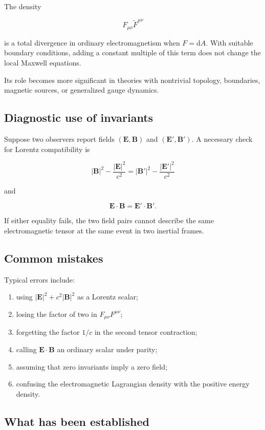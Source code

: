 The density

\[
F_{\mu\nu}
\widetilde{F}^{\mu\nu}
\]

is a total divergence in ordinary electromagnetism when \(F=\mathrm{d}A\). With suitable boundary conditions, adding a constant multiple of this term does not change the local Maxwell equations.

Its role becomes more significant in theories with nontrivial topology, boundaries, magnetic sources, or generalized gauge dynamics.

\subsection{Diagnostic use of invariants}

Suppose two observers report fields \((\mathbf{E},\mathbf{B})\) and \((\mathbf{E}',\mathbf{B}')\). A necessary check for Lorentz compatibility is

\[
|\mathbf{B}|^2
-
\frac{|\mathbf{E}|^2}{c^2}
=
|\mathbf{B}'|^2
-
\frac{|\mathbf{E}'|^2}{c^2}
\]

and

\[
\mathbf{E}\cdot\mathbf{B}
=
\mathbf{E}'\cdot\mathbf{B}'.
\]

If either equality fails, the two field pairs cannot describe the same electromagnetic tensor at the same event in two inertial frames.

\subsection{Common mistakes}

Typical errors include:

\begin{enumerate}
    \item using \(|\mathbf{E}|^2+c^2|\mathbf{B}|^2\) as a Lorentz scalar;
    \item losing the factor of two in \(F_{\mu\nu}F^{\mu\nu}\);
    \item forgetting the factor \(1/c\) in the second tensor contraction;
    \item calling \(\mathbf{E}\cdot\mathbf{B}\) an ordinary scalar under parity;
    \item assuming that zero invariants imply a zero field;
    \item confusing the electromagnetic Lagrangian density with the positive energy density.
\end{enumerate}

\subsection{What has been established}


